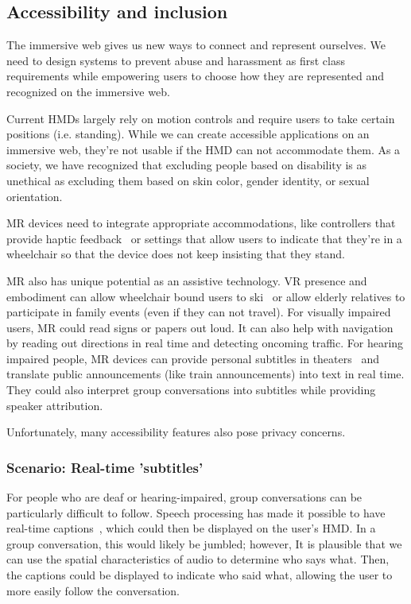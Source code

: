 \subsection{Accessibility and inclusion}

The immersive web gives us new ways to connect and represent ourselves. We need to design systems to prevent abuse and harassment as first class requirements while empowering users to choose how they are represented and recognized on the immersive web.

Current HMDs largely rely on motion controls and require users to take certain positions (i.e. standing). While we can create accessible applications on an immersive web, they're not usable if the HMD can not accommodate them. As a society, we have recognized that excluding people based on disability is as unethical as excluding them based on skin color, gender identity, or sexual orientation.

MR devices need to integrate appropriate accommodations, like controllers that provide haptic feedback~\cite{zhao2018demonstration} or settings that allow users to indicate that they're in a wheelchair so that the device does not keep insisting that they stand.

MR also has unique potential as an assistive technology. VR presence and embodiment can allow wheelchair bound users to ski~\cite{harrell} or allow elderly relatives to participate in family events (even if they can not travel). For visually impaired users, MR could read signs or papers out loud. It can also help with navigation by reading out directions in real time and detecting oncoming traffic. For hearing impaired people, MR devices can provide personal subtitles in theaters~\cite{forrest} and translate public announcements (like train announcements) into text in real time. They could also interpret group conversations into subtitles while providing speaker attribution.

Unfortunately, many accessibility features also pose privacy concerns.

\subsubsection{Scenario: Real-time 'subtitles'}

For people who are deaf or hearing-impaired, group conversations can be particularly difficult to follow. Speech processing has made it possible to have real-time captions~\cite{welch}, which could then be displayed on the user's HMD. In a group conversation, this would likely be jumbled; however, It is plausible that we can use the spatial characteristics of audio to determine who says what. Then, the captions could be displayed to indicate who said what, allowing the user to more easily follow the conversation.

